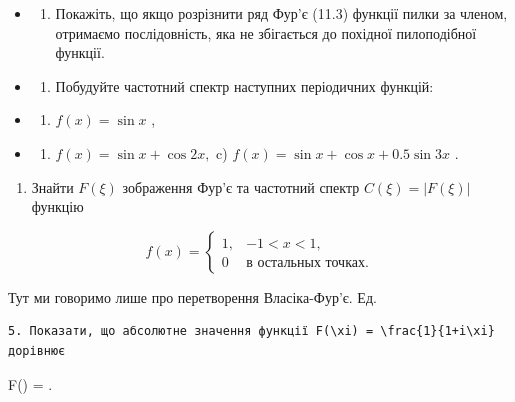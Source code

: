\documentclass[
  ukrainian,
]{article}
\providecommand{\tightlist}{%
  \setlength{\itemsep}{0pt}\setlength{\parskip}{0pt}}
\begin{document}
\begin{itemize}
\tightlist
\item
  \begin{enumerate}
  \def\labelenumi{\arabic{enumi}.}
  \setcounter{enumi}{1}
  \tightlist
  \item
    Покажіть, що якщо розрізнити ряд Фур'є (11.3) функції пилки за
    членом, отримаємо послідовність, яка не збігається до похідної
    пилоподібної функції.
  \end{enumerate}
\item
  \begin{enumerate}
  \def\labelenumi{\arabic{enumi}.}
  \setcounter{enumi}{2}
  \tightlist
  \item
    Побудуйте частотний спектр наступних періодичних функцій:
  \end{enumerate}
\item
  \begin{enumerate}
  \def\labelenumi{\alph{enumi})}
  \tightlist
  \item
    \(f(x) = \sin x\) ,
  \end{enumerate}
\item
  \begin{enumerate}
  \def\labelenumi{\arabic{enumi})}
  \setcounter{enumi}{5}
  \tightlist
  \item
    \(f(x) = \sin x + \cos 2x,\) c)
    \(f(x) = \sin x + \cos x + 0.5 \sin 3x\) .
  \end{enumerate}
\end{itemize}

\begin{enumerate}
\def\labelenumi{\arabic{enumi}.}
\setcounter{enumi}{3}
\tightlist
\item
  Знайти \(F(\xi)\) зображення Фур'є та частотний спектр
  \(C(\xi) = |F(\xi)|\) функцію
\end{enumerate}

\[
f(x) =
\begin{cases} 1, & -1 < x < 1, \\ 0 & \text{в остальных точках.} \end{cases}
\]

Тут ми говоримо лише про перетворення Власіка-Фур'є. Ед.

\begin{verbatim}
5. Показати, що абсолютне значення функції F(\xi) = \frac{1}{1+i\xi} дорівнює
\end{verbatim}

\textbar F(\xi)\textbar{} = .
\end{document}
